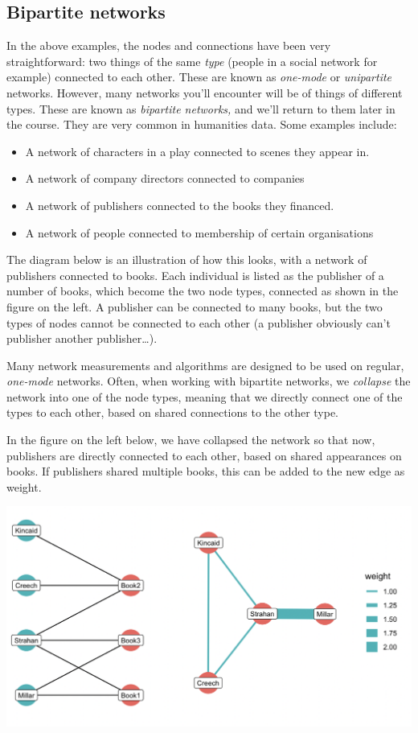 \documentclass[
]{book}
\begin{document}
\hypertarget{bipartite-networks}{%
\subsection{Bipartite networks}\label{bipartite-networks}}

In the above examples, the nodes and connections have been very straightforward: two things of the same \emph{type} (people in a social network for example) connected to each other. These are known as \emph{one-mode} or \emph{unipartite} networks. However, many networks you'll encounter will be of things of different types. These are known as \emph{bipartite networks,} and we'll return to them later in the course. They are very common in humanities data. Some examples include:

\begin{itemize}
\item
  A network of characters in a play connected to scenes they appear in.
\item
  A network of company directors connected to companies
\item
  A network of publishers connected to the books they financed.
\item
  A network of people connected to membership of certain organisations
\end{itemize}

The diagram below is an illustration of how this looks, with a network of publishers connected to books. Each individual is listed as the publisher of a number of books, which become the two node types, connected as shown in the figure on the left. A publisher can be connected to many books, but the two types of nodes cannot be connected to each other (a publisher obviously can't publisher another publisher\ldots).

Many network measurements and algorithms are designed to be used on regular, \emph{one-mode} networks. Often, when working with bipartite networks, we \emph{collapse} the network into one of the node types, meaning that we directly connect one of the types to each other, based on shared connections to the other type.

In the figure on the left below, we have collapsed the network so that now, publishers are directly connected to each other, based on shared appearances on books. If publishers shared multiple books, this can be added to the new edge as weight.

\includegraphics{images/bipartite.png}
\end{document}
